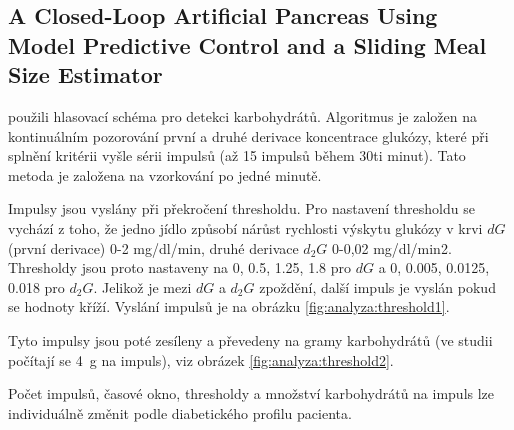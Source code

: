 \subsection{A Closed-Loop Artificial Pancreas Using Model Predictive Control and a Sliding Meal Size Estimator}
\label{ch:analyzaCHO:thrashold}

\citet{analyzaCHO.Thresholds} použili hlasovací schéma pro detekci karbohydrátů. Algoritmus je založen na kontinuálním  pozorování první a druhé derivace koncentrace glukózy, které při splnění kritérii vyšle sérii impulsů (až 15 impulsů během 30ti minut). Tato metoda je založena na vzorkování po jedné minutě.

Impulsy jsou vyslány při překročení thresholdu. Pro nastavení thresholdu se vychází z toho, že jedno jídlo způsobí nárůst rychlosti výskytu glukózy v krvi $dG$ (první derivace) 0-2 mg/dl/min, druhé derivace $d_{2}G$ 0-0,02 mg/dl/min2. Thresholdy jsou proto nastaveny na {0, 0.5, 1.25, 1.8} pro $dG$ a {0, 0.005, 0.0125, 0.018} pro $d_{2}G$. Jelikož je mezi $dG$ a $d_{2}G$ zpoždění, další impuls je vyslán pokud se hodnoty kříží. Vyslání impulsů je na obrázku \ref{fig:analyza:threshold1}.
 
Tyto impulsy jsou poté zesíleny a převedeny na gramy karbohydrátů (ve studii počítají se 4~g na impuls), viz obrázek \ref{fig:analyza:threshold2}.

Počet impulsů, časové okno, thresholdy a množství karbohydrátů na impuls lze individuálně změnit podle diabetického profilu pacienta.

